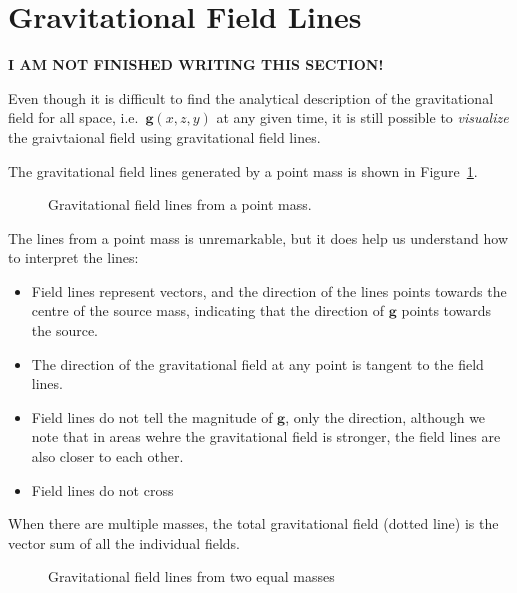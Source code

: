 \section{Gravitational Field Lines}

\textbf{I AM NOT FINISHED WRITING THIS SECTION!}

Even though it is difficult to find the analytical description of the
gravitational field for all space, i.e.\ $\bm g(x,z,y)$ at any given time, it
is still possible to \emph{visualize} the graivtaional field using
gravitational field lines.

The gravitational field lines generated by a point mass is shown in
Figure~\ref{fig:grav-field-lines}.
\begin{figure}[ht]
  \centering
  \caption{Gravitational field lines from a point mass.}
  \label{fig:grav-field-lines}
\end{figure}
The lines from a point mass is unremarkable, but it does help us understand
how to interpret the lines:
\begin{itemize}[itemsep=6pt]
\item Field lines represent vectors, and the direction of the lines points
  towards the centre of the source mass, indicating that the direction of
  $\bm g$ points towards the source.
\item The direction of the gravitational field at any point is tangent to the
  field lines.
\item Field lines do not tell the magnitude of $\bm g$, only the direction,
  although we note that in areas wehre the gravitational field is stronger, the
  field lines are also closer to each other.
\item Field lines do not cross  
\end{itemize}
When there are multiple masses, the total gravitational field (dotted line)
is the vector sum of all the individual fields.
\begin{figure}[ht]
  \centering
  \caption{Gravitational field lines from two equal masses}
\end{figure}







